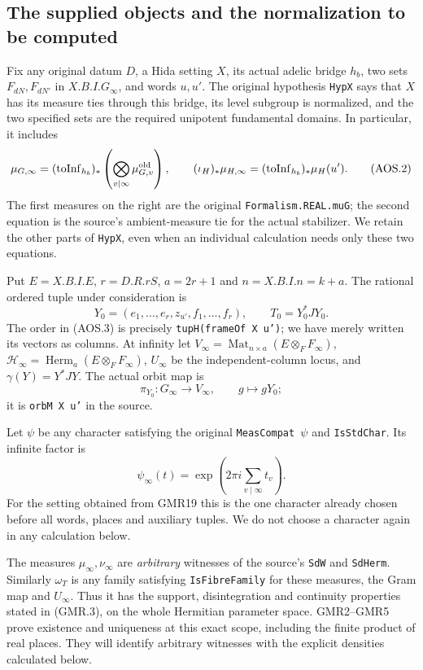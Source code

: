\documentclass[11pt,a4paper]{article}
\numberwithin{equation}{section}
\theoremstyle{remark}\newtheorem{remark}[theorem]{Remark}
\begin{document}
\subsection{The supplied objects and the normalization to be computed}

Fix any original datum $D$, a Hida setting $X$, its actual adelic bridge
$h_b$, two sets $F_{dN},F_{dN'}$ in $X.B.I.G_\infty$, and words
$u,u'$.  The original hypothesis \texttt{Hyp\allowbreak X} says that $X$ has its
measure ties through this bridge, its level subgroup is normalized,
and the two specified sets are the required unipotent fundamental
domains.  In particular, it includes
\[
 \mu_{G,\infty}
   =(\operatorname{toInf}_{h_b})_*
           \left(\bigotimes_{v\mid\infty}\mu_{G,v}^{\rm old}\right),
 \qquad
 (\iota_H)_*\mu_{H,\infty}
    =(\operatorname{toInf}_{h_b})_*\mu_H(u').
 \tag{AOS.2}
\]
The first measures on the right are the original
\texttt{Formalism.\allowbreak REAL.\allowbreak mu\allowbreak G}; the second equation is the source's
ambient-measure tie for the actual stabilizer.  We retain the other
parts of \texttt{Hyp\allowbreak X}, even when an individual calculation needs only
these two equations.

Put $E=X.B.I.E$, $r=D.R.rS$, $a=2r+1$ and $n=X.B.I.n=k+a$.
The rational ordered tuple under consideration is
\[
 Y_0=(e_1,\ldots,e_r,z_{u'},f_1,\ldots,f_r),
 \qquad T_0=Y_0^*JY_0.
 \tag{AOS.3}
\]
The order in (AOS.3) is precisely \texttt{tup\allowbreak H(frame\allowbreak Of X u')};
we have merely written its vectors as columns.  At infinity let
$V_\infty=\operatorname{Mat}_{n\times a}(E\otimes_F F_\infty)$,
$\mathcal H_\infty=\operatorname{Herm}_a(E\otimes_F F_\infty)$,
$U_\infty$ be the independent-column locus, and
$\gamma(Y)=Y^*JY$.  The actual orbit map is
\[
 \pi_{Y_0}:G_\infty\longrightarrow V_\infty,
       \qquad g\longmapsto gY_0;
 \tag{AOS.4}
\]
it is \texttt{orb\allowbreak M X u'} in the source.

Let $\psi$ be any character satisfying the original
\texttt{Meas\allowbreak Compat\,$\psi$} and \texttt{Is\allowbreak Std\allowbreak Char}.  Its infinite
factor is
\[
       \psi_\infty(t)=\exp\left(2\pi i\sum_{v\mid\infty}t_v\right).
 \tag{AOS.5}
\]
For the setting obtained from GMR19 this is the one character already
chosen before all words, places and auxiliary tuples.  We do not
choose a character again in any calculation below.

The measures $\mu_\infty,\nu_\infty$ are \emph{arbitrary} witnesses of
the source's \texttt{Sd\allowbreak W} and \texttt{Sd\allowbreak Herm}.  Similarly
$\omega_T$ is any family satisfying \texttt{Is\allowbreak Fibre\allowbreak Family} for these
measures, the Gram map and $U_\infty$.  Thus it has the support,
disintegration and continuity properties stated in (GMR.3), on the
whole Hermitian parameter space.  GMR2--GMR5 prove existence and
uniqueness at this exact scope, including the finite product of real
places.  They will identify arbitrary witnesses with the explicit
densities calculated below.
\end{document}
